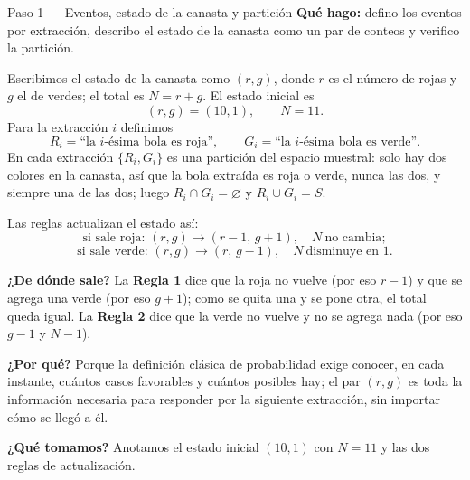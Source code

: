 \documentclass[11pt]{article}
\begin{document}
\begin{paso}{Paso 1 --- Eventos, estado de la canasta y partición}
\textbf{Qué hago:} defino los eventos por extracción, describo el estado de la canasta como un par de conteos y verifico la partición.

Escribimos el estado de la canasta como $(r,g)$, donde $r$ es el número de rojas y $g$ el de verdes; el total es $N=r+g$. El estado inicial es
\[
(r,g)=(10,1),\qquad N=11 .
\]
Para la extracción $i$ definimos
\[
R_i=\text{``la $i$-ésima bola es roja''},\qquad G_i=\text{``la $i$-ésima bola es verde''}.
\]
En cada extracción $\{R_i,G_i\}$ es una partición del espacio muestral: solo hay dos colores en la canasta, así que la bola extraída es roja o verde, nunca las dos, y siempre una de las dos; luego $R_i\cap G_i=\varnothing$ y $R_i\cup G_i=S$.

Las reglas actualizan el estado así:
\[
\text{si sale roja: } (r,g)\longrightarrow (r-1,\,g+1),\quad N\ \text{no cambia};
\]
\[
\text{si sale verde: } (r,g)\longrightarrow (r,\,g-1),\quad N\ \text{disminuye en }1 .
\]

\textbf{¿De dónde sale?} La \textbf{Regla 1} dice que la roja no vuelve (por eso $r-1$) y que se agrega una verde (por eso $g+1$); como se quita una y se pone otra, el total queda igual. La \textbf{Regla 2} dice que la verde no vuelve y no se agrega nada (por eso $g-1$ y $N-1$).

\textbf{¿Por qué?} Porque la definición clásica de probabilidad exige conocer, en cada instante, cuántos casos favorables y cuántos posibles hay; el par $(r,g)$ es toda la información necesaria para responder por la siguiente extracción, sin importar cómo se llegó a él.

\textbf{¿Qué tomamos?} Anotamos el estado inicial $(10,1)$ con $N=11$ y las dos reglas de actualización.
\end{paso}
\end{document}

